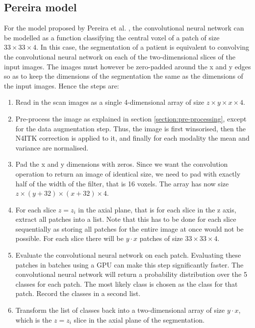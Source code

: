 \documentclass[12pt,a4paper,twoside,openright]{report}
\begin{document}
\subsection{Pereira model}
For the model proposed by Pereira et al. \cite{pereira}, the convolutional neural network can be modelled as a function classifying the central voxel of a patch of size $33 \times 33 \times 4$. In this case, the segmentation of a patient is equivalent to convolving the convolutional neural network on each of the two-dimensional slices of the input images. The images must however be zero-padded around the x and y edges so as to keep the dimensions of the segmentation the same as the dimensions of the input images. Hence the steps are:
\begin{enumerate}
	\item Read in the scan images as a single 4-dimensional array of size $z \times y \times x \times 4$.
	\item Pre-process the image as explained in section \ref{section:pre-processing}, except for the data augmentation step. Thus, the image is first winsorised, then the N4ITK correction is applied to it, and finally for each modality the mean and variance are normalised.
	\item Pad the x and y dimensions with zeros. Since we want the convolution operation to return an image of identical size, we need to pad with exactly half of the width of the filter, that is 16 voxels. The array has now size $z \times (y + 32) \times (x + 32) \times 4$.
	\item For each slice $z = z_i$ in the axial plane, that is for each slice in the z axis, extract all patches into a list. Note that this has to be done for each slice sequentially as storing all patches for the entire image at once would not be possible. For each slice there will be $y \cdot x$ patches of size $33 \times 33 \times 4$.
	\item Evaluate the convolutional neural network on each patch. Evaluating these patches in batches using a GPU can make this step significantly faster. The convolutional neural network will return a probability distribution over the 5 classes for each patch. The most likely class is chosen as the class for that patch. Record the classes in a second list.
	\item Transform the list of classes back into a two-dimensional array of size $y \cdot x$, which is the $z = z_i$ slice in the axial plane of the segmentation.
\end{enumerate}
\end{document}
